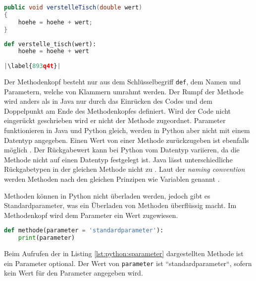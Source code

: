 \begin{minipage}{.5\linewidth}
\begin{lstlisting}[language=java,caption={Methoden in Java},captionpos=b,label={lst:java:methode},frame=none]
public void verstelleTisch(double wert)
{
    hoehe = hoehe + wert;
}
\end{lstlisting}
\end{minipage}
\begin{minipage}{.5\linewidth}
\begin{lstlisting}[language=python,caption={Methode in Python},captionpos=b,label={lst:python:methode},frame=l,escapechar=|]
def verstelle_tisch(wert):
    hoehe = hoehe + wert
    
|\label{893q4t}|
\end{lstlisting}
\end{minipage}

Der Methodenkopf besteht nur aus dem Schlüsselbegriff \texttt{def}, dem Namen und Parametern, welche von Klammern umrahmt werden. Der Rumpf der Methode wird anders als in Java nur durch das Einrücken des Codes und dem Doppelpunkt am Ende des Methodenkopfes definiert. Wird der Code nicht eingerückt geschrieben wird er nicht der Methode zugeordnet. Parameter funktionieren in Java und Python gleich, werden in Python aber nicht mit einem Datentyp angegeben. Einen Wert von einer Methode zurückzugeben ist ebenfalls möglich \cite{Python3:Buch}. Der Rückgabewert kann bei Python vom Datentyp variieren, da die Methode nicht auf einen Datentyp festgelegt ist. Java lässt unterschiedliche Rückgabetypen in der gleichen Methode nicht zu \cite{Louis:2010}. Laut der \textit{naming convention} werden Methoden nach den gleichen Prinzipen wie Variablen genannt \cite{Microsoft:CapCon}\cite{Ims:h-s}.
\par
Methoden können in Python nicht überladen werden, jedoch gibt es Standardparameter, was ein Überladen von Methoden überflüssig macht. Im Methodenkopf wird dem Parameter ein Wert zugewiesen.

\begin{lstlisting}[language=python,caption={Methode in Python mit Standardparameter},captionpos=b,label={lst:python:sparameter},frame=none]
def methode(parameter = 'standardparameter'):
    print(parameter)
\end{lstlisting}

Beim Aufrufen der in Listing \ref{lst:python:sparameter} dargestellten Methode ist ein Parameter optional. Der Wert von \texttt{parameter} ist “standardparameter“, sofern kein Wert für den Parameter angegeben wird.\par
